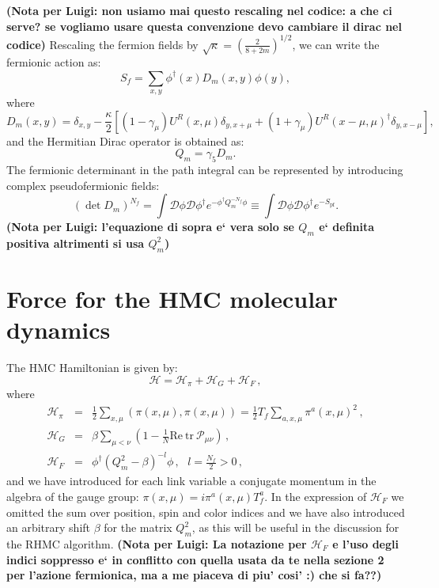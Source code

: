 \documentclass{article}[12pt]
\begin{document}
\textbf{(Nota per Luigi: non usiamo mai questo rescaling nel codice: a che ci serve? se vogliamo usare questa convenzione devo cambiare il dirac nel codice)}
Rescaling the fermion fields by
$\sqrt{\kappa}=\left(\frac{2}{8+2m}\right)^{1/2}$, we can write the
fermionic action as:
%
\begin{equation}
S_f = \sum_{x,y} \phi^\dagger(x) D_m(x,y) \phi(y), 
\end{equation}
%
where
%
\begin{equation}
D_m(x,y) = \delta_{x,y} - \frac{\kappa}{2}
\left[(1-\gamma_\mu) U^R(x,\mu) \delta_{y,x+\mu} + 
(1+\gamma_\mu) U^R(x-\mu,\mu)^\dagger \delta_{y,x-\mu} \right],
\end{equation}
%
and the Hermitian Dirac operator is obtained as:
%
\begin{equation}
Q_m = \gamma_5 D_m. \label{QM}
\end{equation}
The fermionic determinant in the path integral can be represented by
introducing complex pseudofermionic fields:
\begin{equation}
\left(\det D_m\right)^{N_f} = 
\int \mathcal D \phi \mathcal D \phi^\dagger e^{-\phi^\dagger
  Q_m^{-N_f} \phi} \equiv
\int \mathcal D \phi \mathcal D \phi^\dagger e^{-S_\mathrm{pf}}.
\end{equation}
\textbf{(Nota per Luigi: l'equazione di sopra e` vera solo se $Q_m$ e` definita positiva altrimenti si usa $Q_m^2$)}

\section{Force for the HMC molecular dynamics}
The HMC Hamiltonian is given by:
\begin{equation}
\mathcal{H}=\mathcal{H}_\pi+\mathcal{H}_G+\mathcal{H}_F \, ,
\end{equation}
where
\begin{eqnarray}
\mathcal{H}_\pi &=& \frac{1}{2} \sum_{x,\mu} ( \pi(x,\mu) , \pi(x,\mu) ) = \frac{1}{2} T_f \sum_{a,x,\mu} \pi^a(x,\mu)^2 \, ,\\
\mathcal{H}_G &=& \beta \sum_{\mu<\nu} \left( 1- \frac{1}{N} \mathrm{Re\ tr\ } \mathcal{P}_{\mu\nu}\right) \, ,\\
\mathcal{H}_F &=& \phi^\dagger ( Q_m^2 - \beta )^{-l} \phi \, , \,\,\,\, l=\frac{N_f}{2}>0 \, ,
\end{eqnarray}
and we have introduced for each link variable a conjugate momentum in the algebra of the gauge group: $\pi(x,\mu)=i \pi^a(x,\mu) T_f^a$.
In the expression of $\mathcal{H}_F$ we omitted the sum over position, spin and color indices and we have also introduced an arbitrary shift $\beta$ for the matrix $Q_m^2$, as this will be useful in the discussion
for the RHMC algorithm.
\textbf{(Nota per Luigi: La notazione per $\mathcal{H}_F$ e l'uso degli indici soppresso e` in conflitto con quella usata da te nella sezione 2 per l'azione fermionica, ma a me piaceva di piu' cosi' :) che si fa??)}
\end{document}
